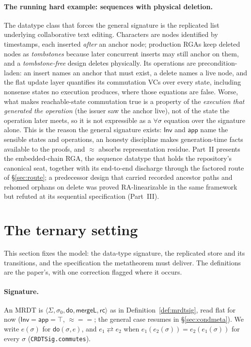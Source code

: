 \documentclass[11pt]{article}
\newcommand{\rcrel}{\mathsf{rc}}                 %
\newcommand{\comm}{\rightleftarrows}
\newcommand{\mergeL}{\mathsf{mergeL}}
\newcommand{\Sinit}{\sigma_0}
\newcommand{\lean}[1]{\texttt{#1}}
\newcommand{\eqobs}{\approx}
\newcommand{\Inv}{\mathsf{Inv}}
\newcommand{\app}{\mathsf{app}}
\begin{document}
\paragraph{The running hard example: sequences with physical deletion.}
The datatype class that forces the general signature is the replicated
list underlying collaborative text editing. Characters are nodes
identified by timestamps, each inserted \emph{after} an anchor node;
production RGAs keep deleted nodes as \emph{tombstones} because later
concurrent inserts may still anchor on them, and a \emph{tombstone-free}
design deletes physically. Its operations are precondition-laden: an
insert names an anchor that must exist, a delete names a live node, and
the flat update layer quantifies its commutation VCs over every state,
including nonsense states no execution produces, where those equations
are false. Worse, what makes reachable-state commutation true is a
property of the \emph{execution that generated the operation} (the
issuer saw the anchor live), not of the state the operation later meets,
so it is not expressible as a $\forall\sigma$ equation over the
signature alone. This is the reason the general signature exists: $\Inv$
and $\app$ name the sensible states and operations, an honesty
discipline makes generation-time facts available to the proofs, and
$\eqobs$ absorbs representation residue. Part~II presents the
embedded-chain RGA, the sequence datatype that holds the repository's
canonical seat, together with its end-to-end discharge through the
factored route of \S\ref{sec:route}; a predecessor design that carried
recorded ancestor paths and rehomed orphans on delete was proved
RA-linearizable in the same framework but refuted at its
sequential specification (Part~III).

\section{The ternary setting}
\label{sec:setting}

This section fixes the model: the data-type signature, the replicated
store and its transitions, and the specification the metatheorem must
deliver. The definitions are the paper's, with one correction flagged
where it occurs.

\paragraph{Signature.} An MRDT is $\langle \Sigma, \Sinit, \mathsf{do},
\mergeL, \rcrel\rangle$ as in Definition~\ref{def:mrdtsig}, read flat
for now ($\Inv = \app = \top$, ${\eqobs} = {=}$; the general case
resumes in \S\ref{sec:condmeta}). We write $e(\sigma)$ for
$\mathsf{do}(\sigma,e)$, and $e_1 \comm e_2$ when
$e_1(e_2(\sigma)) = e_2(e_1(\sigma))$ for every $\sigma$
(\lean{CRDTSig.commutes}).
\end{document}
